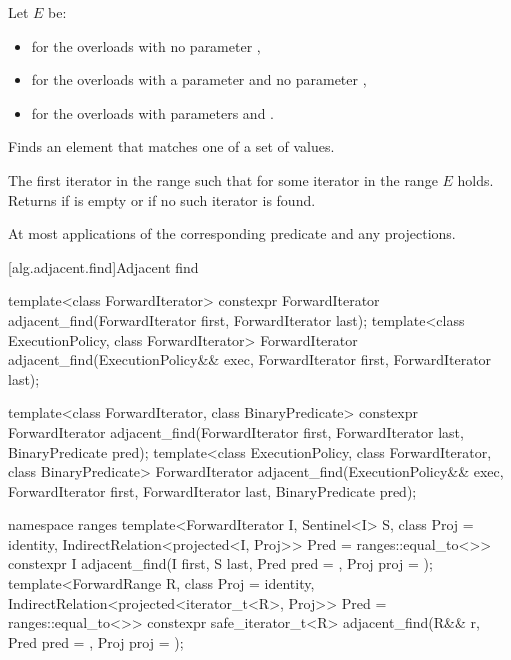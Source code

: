 \begin{itemdescr}
\pnum
Let $E$ be:
\begin{itemize}
\item {} for the overloads with no parameter ,
\item {} for the overloads with a parameter  and no parameter ,
\item {} for the overloads with parameters  and .
\end{itemize}

\pnum
\effects
Finds an element that matches one of a set of values.

\pnum
\returns
The first iterator  in the range 
such that for some iterator  in the range 
$E$ holds.
Returns 
if  is empty or
if no such iterator is found.

\pnum
\complexity
At most  applications
of the corresponding predicate and any projections.
\end{itemdescr}

[alg.adjacent.find]{Adjacent find}

%
\begin{itemdecl}
template<class ForwardIterator>
  constexpr ForwardIterator
    adjacent_find(ForwardIterator first, ForwardIterator last);
template<class ExecutionPolicy, class ForwardIterator>
  ForwardIterator
    adjacent_find(ExecutionPolicy&& exec,
                  ForwardIterator first, ForwardIterator last);

template<class ForwardIterator, class BinaryPredicate>
  constexpr ForwardIterator
    adjacent_find(ForwardIterator first, ForwardIterator last,
                  BinaryPredicate pred);
template<class ExecutionPolicy, class ForwardIterator, class BinaryPredicate>
  ForwardIterator
    adjacent_find(ExecutionPolicy&& exec,
                  ForwardIterator first, ForwardIterator last,
                  BinaryPredicate pred);

namespace ranges {
  template<ForwardIterator I, Sentinel<I> S, class Proj = identity,
           IndirectRelation<projected<I, Proj>> Pred = ranges::equal_to<>>
    constexpr I adjacent_find(I first, S last, Pred pred = {},
                              Proj proj = {});
  template<ForwardRange R, class Proj = identity,
           IndirectRelation<projected<iterator_t<R>, Proj>> Pred = ranges::equal_to<>>
    constexpr safe_iterator_t<R>
      adjacent_find(R&& r, Pred pred = {}, Proj proj = {});
}
\end{itemdecl}

